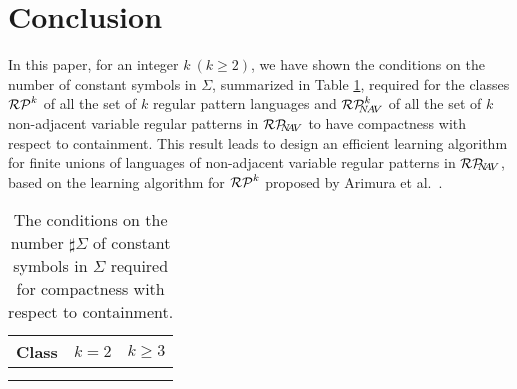 \section{Conclusion}
In this paper, for an integer $k~(k\ge 2)$, we have shown the conditions on the number of constant symbols in $\Sigma$, summarized in Table \ref{table:results}, required for the classes $\RPatkei$ of all the set of $k$ regular pattern languages and $\NAVRPkei$ of all the set of $k$ non-adjacent variable regular patterns in $\mathcal{RP}_{\!\!\!N\!\!A\!V}$ to have compactness with respect to containment.
This result leads to design an efficient learning algorithm for finite unions of languages of non-adjacent variable regular patterns in $\mathcal{RP}_{\!\!\!N\!\!A\!V}$, based on the learning algorithm for $\RPatkei$ proposed by Arimura et al.~\cite{Arimura1994}.
\begin{table}
\caption{The conditions on the number $\sharp \Sigma$ of constant symbols in $\Sigma$ required for compactness with respect to containment.}\label{table:results}
\begin{center}
\begin{tabular}{c|c|c}
  Class & $k=2$ & $k\ge 3$\\
  \hline
  \raisebox{-5pt}{$\RPatkei$} & \raisebox{-5pt}{$\sharp \Sigma \ge 4$} & \raisebox{-5pt}{$\sharp \Sigma \ge 2k-1$} \\[10pt]
  \hline
  \raisebox{-5pt}{$\NAVRPkei$} & \multicolumn{2}{c}{\raisebox{-5pt}{$\sharp \Sigma \ge k+2$}}\\[10pt]
\end{tabular}
\end{center}
\vspace*{-10pt}
\end{table}

